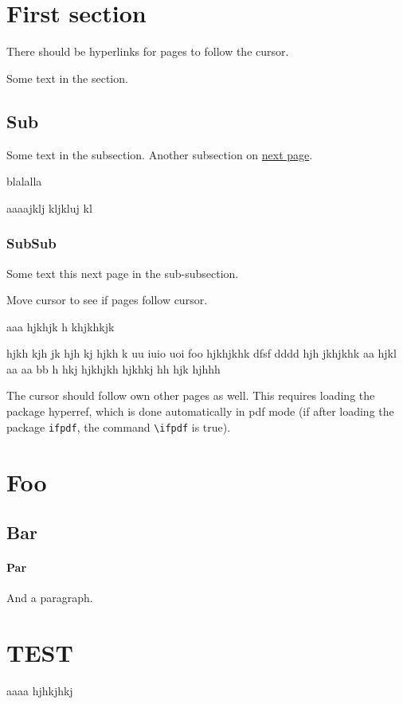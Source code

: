 \documentclass{article}
\begin{document}
\section{First section}

There should be hyperlinks for pages to follow the cursor.  

\tableofcontents



Some text in the section.  
 
\subsection {Sub}

Some text in the subsection. 
Another subsection on \hyperlink{next}{next page}.


blalalla  
\newpage

aaaajklj kljkluj kl
\subsubsection {SubSub} 

Some text this \hypertarget{next}{next page} in the sub-subsection. 

Move cursor to see if pages follow cursor.

\newpage

aaa hjkhjk h
\newpage
khjkhkjk

hjkh kjh jk  hjh kj hjkh k uu iuio uoi foo
hjkhjkhk  dfsf dddd hjh jkhjkhk aa hjkl
aa aa  bb  h hkj    hjkhjkh  hjkhkj hh hjk hjhhh

\medskip




The cursor should follow own other pages as well.
This requires loading the package hyperref, which is done
automatically in pdf mode (if after loading the package \texttt{ifpdf}, 
the command \verb"\ifpdf" is true). 



\section{Foo}

\subsection {Bar}


\paragraph {Par}

And a paragraph.


\section {TEST}

aaaa  hjhkjhkj 
\end{document}
